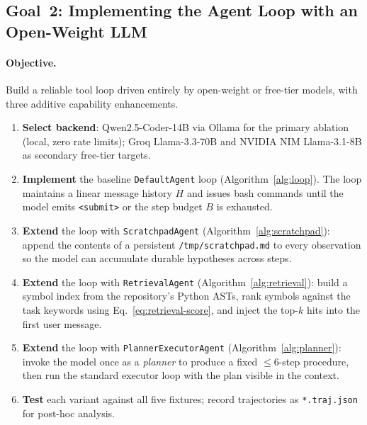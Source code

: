 \documentclass[11pt]{article}
\begin{document}
\subsection{Goal~2: Implementing the Agent Loop with an Open-Weight LLM}
\label{sec:goal-loop}

\paragraph{Objective.}
Build a reliable tool loop driven entirely by open-weight or free-tier
models, with three additive capability enhancements.

\begin{enumerate}[leftmargin=*,label=\textbf{Step~\arabic*.}]
  \item \textbf{Select backend}: Qwen2.5-Coder-14B via Ollama for the primary
        ablation (local, zero rate limits); Groq Llama-3.3-70B and NVIDIA NIM
        Llama-3.1-8B as secondary free-tier targets.
  \item \textbf{Implement} the baseline \texttt{DefaultAgent} loop
        (Algorithm~\ref{alg:loop}).  The loop maintains a linear message
        history $H$ and issues bash commands until the model emits
        \texttt{<submit>} or the step budget $B$ is exhausted.
  \item \textbf{Extend} the loop with \texttt{ScratchpadAgent}
        (Algorithm~\ref{alg:scratchpad}): append the contents of a
        persistent \texttt{/tmp/scratchpad.md} to every observation so the
        model can accumulate durable hypotheses across steps.
  \item \textbf{Extend} the loop with \texttt{RetrievalAgent}
        (Algorithm~\ref{alg:retrieval}): build a symbol index from the
        repository's Python ASTs, rank symbols against the task keywords
        using Eq.~\eqref{eq:retrieval-score}, and inject the top-$k$ hits
        into the first user message.
  \item \textbf{Extend} the loop with \texttt{PlannerExecutorAgent}
        (Algorithm~\ref{alg:planner}): invoke the model once as a
        \emph{planner} to produce a fixed $\leq 6$-step procedure, then
        run the standard executor loop with the plan visible in the context.
  \item \textbf{Test} each variant against all five fixtures;
        record trajectories as \texttt{*.traj.json} for post-hoc analysis.
\end{enumerate}
\end{document}
